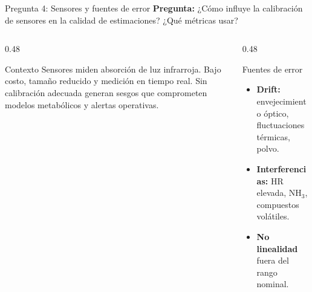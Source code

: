 \documentclass[aspectratio=169, 11pt]{beamer}
\newcommand{\NDIR}{\text{NDIR}}
\begin{document}
\begin{frame}{Pregunta 4: Sensores \NDIR{} y fuentes de error}
\textbf{Pregunta:} ¿Cómo influye la calibración de sensores \NDIR{} en la calidad de estimaciones? ¿Qué métricas usar?

\vspace{0.3cm}
\begin{columns}[T]
\begin{column}{0.48\textwidth}
\begin{block}{Contexto}
\footnotesize
Sensores \NDIR{} miden absorción de luz infrarroja. Bajo costo, tamaño reducido y medición en tiempo real. Sin calibración adecuada generan sesgos que comprometen modelos metabólicos y alertas operativas.
\end{block}
\end{column}
\begin{column}{0.48\textwidth}
\begin{alertblock}{Fuentes de error}
\footnotesize
\begin{itemize}
    \item \textbf{Drift:} envejecimiento óptico, fluctuaciones térmicas, polvo.
    \item \textbf{Interferencias:} HR elevada, NH$_3$, compuestos volátiles.
    \item \textbf{No linealidad} fuera del rango nominal.
\end{itemize}
\end{alertblock}
\end{column}
\end{columns}
\end{frame}
\end{document}
